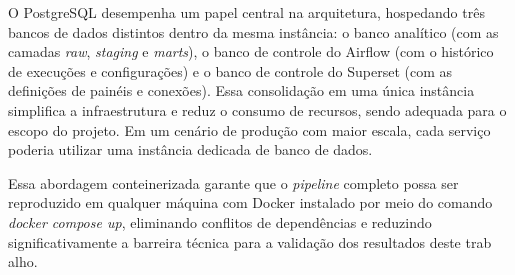 O PostgreSQL desempenha um papel central na arquitetura, hospedando três bancos de dados
distintos dentro da mesma instância: o banco analítico (com as camadas \textit{raw},
\textit{staging} e \textit{marts}), o banco de controle do Airflow (com o histórico de
execuções e configurações) e o banco de controle do Superset (com as definições de painéis e
conexões). Essa consolidação em uma única instância simplifica a infraestrutura e reduz o
consumo de recursos, sendo adequada para o escopo do projeto. Em um cenário de produção com
maior escala, cada serviço poderia utilizar uma instância dedicada de banco de dados.

Essa abordagem conteinerizada garante que o \textit{pipeline} completo possa ser reproduzido
em qualquer máquina com Docker instalado por meio do comando \textit{docker compose up},
eliminando conflitos de dependências e reduzindo significativamente a barreira técnica para a
validação dos resultados deste trab
alho.